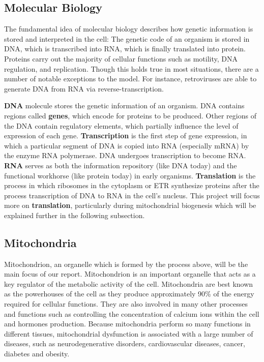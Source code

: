 \newpage

\subsection{Molecular Biology}
The fundamental idea of molecular biology describes how genetic information is stored and interpreted in the cell: The genetic code of an organism is stored in DNA, which is transcribed into RNA, which is finally translated into protein. Proteins carry out the majority of cellular functions such as motility, DNA regulation, and replication. Though this holds true in most situations, there are a number of notable exceptions to the model. For instance, retroviruses are able to generate DNA from RNA via reverse-transcription. 

\textbf{DNA} molecule stores the genetic information of an organism. DNA contains regions called \textbf{genes}, which encode for proteins to be produced. Other regions of the DNA contain regulatory elements, which partially influence the level of expression of each gene. \textbf{Transcription} is the first step of gene expression, in which a particular segment of DNA is copied into RNA (especially mRNA) by the enzyme RNA polymerase. DNA undergoes transcription to become RNA. \textbf{RNA} serves as both the information repository (like DNA today) and the functional workhorse (like protein today) in early organisms. \textbf{Translation} is the process in which ribosomes in the cytoplasm or ETR synthesize proteins after the process transcription of DNA to RNA in the cell's nucleus. This project will focus more on \textbf{translation}, particularly during mitochondrial biogenesis which will be explained further in the following subsection.

\subsection{Mitochondria}
Mitochondrion, an organelle which is formed by the process above, will be the main focus of our report. Mitochondrion \cite{Alberts2002} is an important organelle that acts as a key regulator of the metabolic activity of the cell. Mitochondria are best known as the powerhouses of the cell as they produce approximately 90\% of the energy required for cellular functions.  They are also involved in many other processes and functions such as controlling the concentration of calcium ions within the cell and hormones production. Because mitochondria perform so many functions in different tissues, mitochondrial dysfunction is associated with a large number of diseases, such as neurodegenerative disorders, cardiovascular diseases, cancer, diabetes and obesity. 
 
